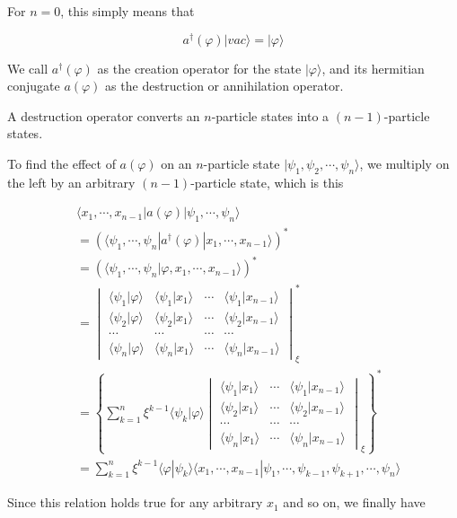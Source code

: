 For $n=0$, this simply means that

\[a^\dagger(\varphi)|vac\rangle = |\varphi\rangle \]

We call $a^\dagger(\varphi)$ as the creation operator for the state $|\varphi\rangle$, and its hermitian conjugate $a(\varphi)$ as the destruction or annihilation operator. 

A destruction operator converts an $n$-particle states into a $(n-1)$-particle states. 

To find the effect of $a(\varphi)$ on an $n$-particle state $|\psi_1,\psi_2,\cdots,\psi_n\rangle$, we multiply on the left by an arbitrary $(n-1)$-particle state, which is this

\[\begin{split}
&\langle x_1,\cdots,x_{n-1}|a(\varphi)|\psi_1,\cdots,\psi_n\rangle \\
&= (\langle \psi_1,\cdots,\psi_n|a^\dagger(\varphi)|x_1,\cdots,x_{n-1}\rangle)^*\\
&= (\langle \psi_1,\cdots,\psi_n|\varphi,x_1,\cdots,x_{n-1}\rangle)^*\\
&= 
\begin{vmatrix}
\langle\psi_1|\varphi\rangle & \langle\psi_1|x_1\rangle & \cdots & \langle\psi_1|x_{n-1}\rangle\\
\langle\psi_2|\varphi\rangle & \langle\psi_2|x_1\rangle & \cdots & \langle\psi_2|x_{n-1}\rangle\\
\cdots & \cdots & \cdots & \cdots \\
\langle\psi_n|\varphi\rangle & \langle\psi_n|x_1\rangle & \cdots & \langle\psi_n|x_{n-1}\rangle
\end{vmatrix}_{\xi}^*\\
&= \left\{\sum_{k=1}^n \xi^{k-1}\langle\psi_k|\varphi\rangle
\begin{vmatrix}
 \langle\psi_1|x_1\rangle & \cdots & \langle\psi_1|x_{n-1}\rangle\\
 \langle\psi_2|x_1\rangle & \cdots & \langle\psi_2|x_{n-1}\rangle\\
 \cdots & \cdots & \cdots \\
 \langle\psi_n|x_1\rangle & \cdots & \langle\psi_n|x_{n-1}\rangle
\end{vmatrix}_{\xi} \right\}^*\\
&= \sum_{k=1}^n \xi^{k-1}\langle\varphi|\psi_k\rangle\langle x_1,\cdots,x_{n-1}|\psi_1,\cdots,\psi_{k-1},\psi_{k+1},\cdots,\psi_n\rangle
\end{split}\]

Since this relation holds true for any arbitrary $x_1$ and so on, we finally have


